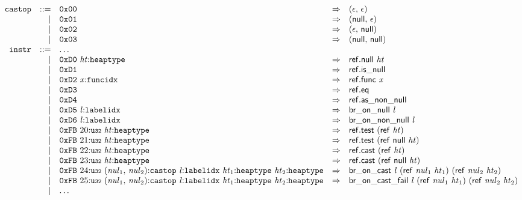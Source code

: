 $$
\begin{array}{@{}l@{}rrlll@{}l@{}}
& {\mathtt{castop}} &::=& \mathtt{0x00} &\Rightarrow& (\epsilon,\, \epsilon) \\ &&|&
\mathtt{0x01} &\Rightarrow& (\mathsf{null},\, \epsilon) \\ &&|&
\mathtt{0x02} &\Rightarrow& (\epsilon,\, \mathsf{null}) \\ &&|&
\mathtt{0x03} &\Rightarrow& (\mathsf{null},\, \mathsf{null}) \\
& {\mathtt{instr}} &::=& \dots \\ &&|&
\mathtt{0xD0}~{\mathit{ht}}{:}{\mathtt{heaptype}} &\Rightarrow& \mathsf{ref.null}~{\mathit{ht}} \\ &&|&
\mathtt{0xD1} &\Rightarrow& \mathsf{ref.is\_null} \\ &&|&
\mathtt{0xD2}~{\mathit{x}}{:}{\mathtt{funcidx}} &\Rightarrow& \mathsf{ref.func}~{\mathit{x}} \\ &&|&
\mathtt{0xD3} &\Rightarrow& \mathsf{ref.eq} \\ &&|&
\mathtt{0xD4} &\Rightarrow& \mathsf{ref.as\_non\_null} \\ &&|&
\mathtt{0xD5}~{\mathit{l}}{:}{\mathtt{labelidx}} &\Rightarrow& \mathsf{br\_on\_null}~{\mathit{l}} \\ &&|&
\mathtt{0xD6}~{\mathit{l}}{:}{\mathtt{labelidx}} &\Rightarrow& \mathsf{br\_on\_non\_null}~{\mathit{l}} \\ &&|&
\mathtt{0xFB}~20{:}{\mathtt{u{\scriptstyle32}}}~{\mathit{ht}}{:}{\mathtt{heaptype}} &\Rightarrow& \mathsf{ref.test}~(\mathsf{ref}~{\mathit{ht}}) \\ &&|&
\mathtt{0xFB}~21{:}{\mathtt{u{\scriptstyle32}}}~{\mathit{ht}}{:}{\mathtt{heaptype}} &\Rightarrow& \mathsf{ref.test}~(\mathsf{ref}~\mathsf{null}~{\mathit{ht}}) \\ &&|&
\mathtt{0xFB}~22{:}{\mathtt{u{\scriptstyle32}}}~{\mathit{ht}}{:}{\mathtt{heaptype}} &\Rightarrow& \mathsf{ref.cast}~(\mathsf{ref}~{\mathit{ht}}) \\ &&|&
\mathtt{0xFB}~23{:}{\mathtt{u{\scriptstyle32}}}~{\mathit{ht}}{:}{\mathtt{heaptype}} &\Rightarrow& \mathsf{ref.cast}~(\mathsf{ref}~\mathsf{null}~{\mathit{ht}}) \\ &&|&
\mathtt{0xFB}~24{:}{\mathtt{u{\scriptstyle32}}}~({\mathit{nul}}_{{1}},\, {\mathit{nul}}_{{2}}){:}{\mathtt{castop}}~{\mathit{l}}{:}{\mathtt{labelidx}}~{\mathit{ht}}_{{1}}{:}{\mathtt{heaptype}}~{\mathit{ht}}_{{2}}{:}{\mathtt{heaptype}} &\Rightarrow& \mathsf{br\_on\_cast}~{\mathit{l}}~(\mathsf{ref}~{\mathit{nul}}_{{1}}~{\mathit{ht}}_{{1}})~(\mathsf{ref}~{\mathit{nul}}_{{2}}~{\mathit{ht}}_{{2}}) \\ &&|&
\mathtt{0xFB}~25{:}{\mathtt{u{\scriptstyle32}}}~({\mathit{nul}}_{{1}},\, {\mathit{nul}}_{{2}}){:}{\mathtt{castop}}~{\mathit{l}}{:}{\mathtt{labelidx}}~{\mathit{ht}}_{{1}}{:}{\mathtt{heaptype}}~{\mathit{ht}}_{{2}}{:}{\mathtt{heaptype}} &\Rightarrow& \mathsf{br\_on\_cast\_fail}~{\mathit{l}}~(\mathsf{ref}~{\mathit{nul}}_{{1}}~{\mathit{ht}}_{{1}})~(\mathsf{ref}~{\mathit{nul}}_{{2}}~{\mathit{ht}}_{{2}}) \\ &&|&
\dots \\
\end{array}
$$

